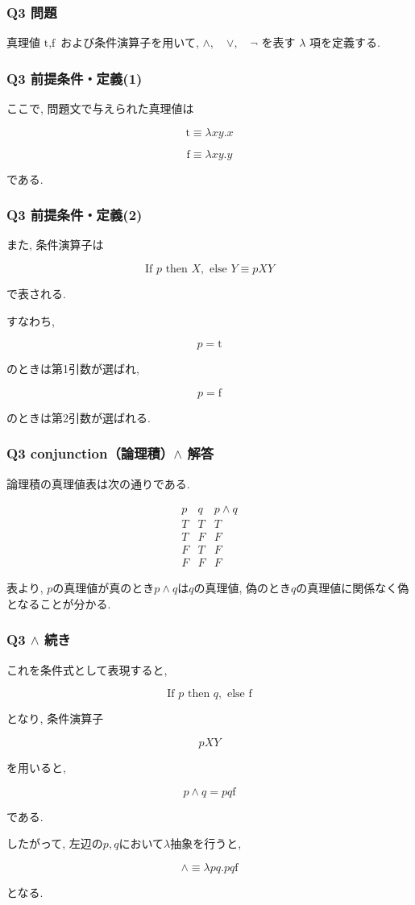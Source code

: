 \begin{frame}[fragile]
\frametitle{Q3 問題}

真理値
$\text{t}, \text{f}$
および条件演算子を用いて, 
$\land,\quad \lor,\quad \neg$
を表す $\lambda$ 項を定義する.

\end{frame}

\begin{frame}[fragile]
\frametitle{Q3 前提条件・定義(1)}

ここで, 問題文で与えられた真理値は

\[
\text{t}
\equiv
\lambda xy.x
\]

\[
\text{f}
\equiv
\lambda xy.y
\]

である.

\end{frame}

\begin{frame}[fragile]
\frametitle{Q3 前提条件・定義(2)}

また, 条件演算子は

\[
\text{If }p\text{ then }X,\text{ else }Y
\equiv
pXY
\]

で表される.

すなわち, 

\[
p=\text{t}
\]

のときは第1引数が選ばれ, 

\[
p=\text{f}
\]

のときは第2引数が選ばれる.
\end{frame}

\begin{frame}[fragile]
\frametitle{Q3 conjunction（論理積）$\land$ 解答}

論理積の真理値表は次の通りである.

\[
\begin{array}{c|c|c}
p & q & p\land q\\
\hline
T & T & T\\
T & F & F\\
F & T & F\\
F & F & F
\end{array}
\]

表より, $p$の真理値が真のとき$p \land q$は$q$の真理値, 偽のとき$q$の真理値に関係なく偽となることが分かる.
\end{frame}

\begin{frame}[fragile]

\frametitle{Q3 $\land$ 続き}

これを条件式として表現すると, 

\[
\text{If }p\text{ then }q,
\text{ else }\text{f}
\]

となり, 条件演算子

\[
pXY
\]

を用いると, 

\[
p\land q = pq\text{f}
\]

である.

したがって, 左辺の$p, q$において$\lambda$抽象を行うと, 

\[
\boxed{
\land \equiv \lambda pq.pq\text{f}
}
\]

となる.

\end{frame}

